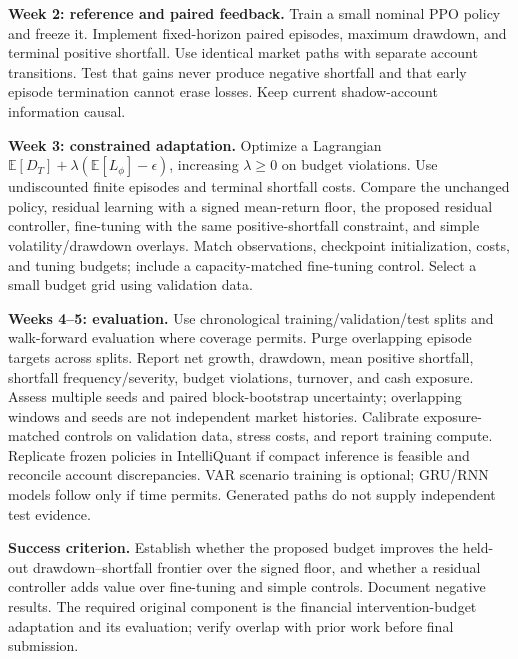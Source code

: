 \documentclass[10pt]{article}
\begin{document}
\textbf{Week 2: reference and paired feedback.} Train a small nominal PPO policy and freeze it. Implement fixed-horizon paired episodes, maximum drawdown, and terminal positive shortfall. Use identical market paths with separate account transitions. Test that gains never produce negative shortfall and that early episode termination cannot erase losses. Keep current shadow-account information causal.

\textbf{Week 3: constrained adaptation.} Optimize a Lagrangian $\mathbb E[D_T]+\lambda(\mathbb E[L_\phi]-\epsilon)$, increasing $\lambda\geq0$ on budget violations. Use undiscounted finite episodes and terminal shortfall costs. Compare the unchanged policy, residual learning with a signed mean-return floor, the proposed residual controller, fine-tuning with the same positive-shortfall constraint, and simple volatility/drawdown overlays. Match observations, checkpoint initialization, costs, and tuning budgets; include a capacity-matched fine-tuning control. Select a small budget grid using validation data.

\textbf{Weeks 4--5: evaluation.} Use chronological training/validation/test splits and walk-forward evaluation where coverage permits. Purge overlapping episode targets across splits. Report net growth, drawdown, mean positive shortfall, shortfall frequency/severity, budget violations, turnover, and cash exposure. Assess multiple seeds and paired block-bootstrap uncertainty; overlapping windows and seeds are not independent market histories. Calibrate exposure-matched controls on validation data, stress costs, and report training compute. Replicate frozen policies in IntelliQuant if compact inference is feasible and reconcile account discrepancies. VAR scenario training is optional; GRU/RNN models follow only if time permits. Generated paths do not supply independent test evidence.

\textbf{Success criterion.} Establish whether the proposed budget improves the held-out drawdown--shortfall frontier over the signed floor, and whether a residual controller adds value over fine-tuning and simple controls. Document negative results. The required original component is the financial intervention-budget adaptation and its evaluation; verify overlap with prior work before final submission.
\end{document}
